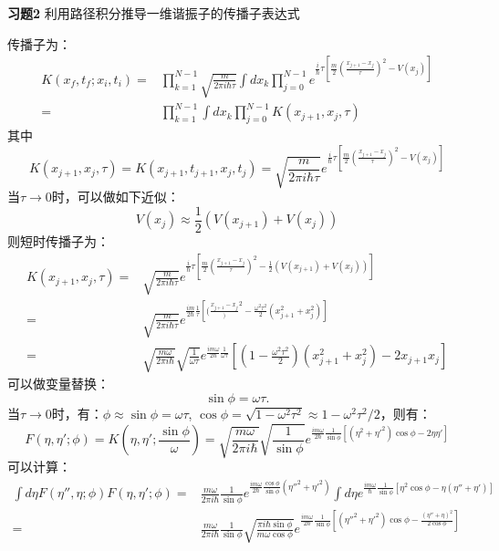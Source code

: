 \documentclass[reqno,a4paper,12pt]{amsart}
\begin{document}
\textbf{习题2} 利用路径积分推导一维谐振子的传播子表达式
\begin{tcolorbox}[breakable, colback = black!5!white, colframe = black]
传播子为：
\begin{align*}
	K(x_f, t_f; x_i, t_i) =& \prod_{k=1}^{N-1} \sqrt{\frac{m}{2\pi i\hbar \tau}} \int dx_k \prod_{j=0}^{N-1} e^{\frac{i}{\hbar}\tau \left[ \frac{m}{2}\left( \frac{x_{j+1}-x_j}{\tau} \right)^2 -V(x_j) \right]} \\
	=& \prod_{k=1}^{N-1} \int dx_k \prod_{j=0}^{N-1} K(x_{j+1}, x_j, \tau)
\end{align*}
其中
\[
	K(x_{j+1}, x_j, \tau) = K(x_{j+1}, t_{j+1}, x_j, t_j) = \sqrt{\frac{m}{2\pi i\hbar\tau}} e^{\frac{i}{\hbar}\tau\left[ \frac{m}{2}\left( \frac{x_{j+1}-x_j}{\tau} \right)^2 - V(x_j) \right]}
\]
当$\tau \to 0$时，可以做如下近似：
\[
	V(x_j) \approx \frac{1}{2}(V(x_{j+1}) + V(x_j))
\]
则短时传播子为：
\begin{align*}
	K(x_{j+1}, x_j, \tau) =& \sqrt{\frac{m}{2\pi i \hbar\tau}} e^{\frac{i}{\hbar}\tau\left[ \frac{m}{2}\left( \frac{x_{j+1}-x_j}{\tau} \right)^2 - \frac{1}{2}(V(x_{j+1}) + V(x_j)) \right]} \\
	=& \sqrt{\frac{m}{2\pi i \hbar\tau}} e^{\frac{i m}{2\hbar}\frac{1}{\tau} \left[ ( \frac{x_{j+1}-x_j} )^2 - \frac{\omega^2 \tau^2}{2}(x_{j+1}^2 + x_j^2) \right]} \\
	=& \sqrt{\frac{m\omega}{2\pi i \hbar}} \sqrt{\frac{1}{\omega \tau}} e^{\frac{im\omega}{2\hbar} \frac{1}{\omega \tau}} \left[ \left( 1-\frac{\omega^2\tau^2}{2} \right)(x_{j+1}^2+x_j^2) - 2x_{j+1}x_j \right]
\end{align*}
可以做变量替换：
\[
	\sin \phi = \omega \tau.
\]
当$\tau\to 0$时，有：$\phi \approx \sin\phi = \omega \tau$, $\cos\phi = \sqrt{1-\omega^2\tau^2} \approx 1-\omega^2\tau^2/2$，则有：
\[
	F(\eta, \eta'; \phi) = K(\eta, \eta'; \frac{\sin\phi}{\omega}) = \sqrt{\frac{m\omega}{2\pi i\hbar}} \sqrt{\frac{1}{\sin\phi}} e^{\frac{im\omega}{2\hbar}\frac{1}{\sin\phi}[(\eta^2+\eta'^2)\cos\phi-2\eta\eta']}
\]
可以计算：
\begin{align*}
	\int d\eta F(\eta'', \eta; \phi) F(\eta, \eta'; \phi) =& \frac{m\omega}{2\pi i\hbar}\frac{1}{\sin\phi} e^{\frac{im\omega}{2\hbar} \frac{\cos\phi}{\sin\phi} (\eta''^2+\eta'^2)} \int d\eta e^{\frac{im\omega}{\hbar}\frac{1}{\sin\phi} [\eta^2\cos\phi-\eta(\eta''+\eta')]} \\
	=& \frac{m\omega}{2\pi i\hbar}\frac{1}{\sin\phi} \sqrt{\frac{\pi i\hbar\sin\phi}{m\omega\cos\phi}} e^{\frac{im\omega}{2\hbar} \frac{1}{\sin\phi} [(\eta''^2+\eta'^2) \cos\phi - \frac{(\eta''+\eta)^2}{2\cos\phi}]} \\

\end{align*}
\end{tcolorbox}
\end{document}
